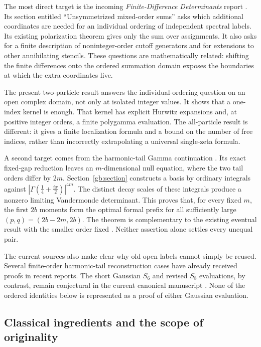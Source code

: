 \documentclass[11pt,a4paper]{article}
\numberwithin{equation}{section}
\theoremstyle{definition}
\theoremstyle{remark}
\begin{document}
The most direct target is the incoming \emph{Finite-Difference
Determinants} report \cite{repo:finite}. Its section entitled
``Unsymmetrized mixed-order sums'' asks which additional coordinates are
needed for an individual ordering of independent spectral labels.
Its existing polarization theorem gives only the sum over assignments.
It also asks for a finite description of noninteger-order cutoff
generators and for extensions to other annihilating stencils. These
questions are mathematically related: shifting the finite differences
onto the ordered summation domain exposes the boundaries at which
the extra coordinates live.

The present two-particle result answers the individual-ordering question
on an open complex domain, not only at isolated integer values.
It shows that a one-index kernel is enough. That kernel has explicit
Hurwitz expansions and, at positive integer orders, a finite polygamma
evaluation. The all-particle result is different: it gives a finite
localization formula and a bound on the number of free indices, rather
than incorrectly extrapolating a universal single-zeta formula.

A second target comes from the harmonic-tail Gamma continuation
\cite{repo-gamma}. Its exact fixed-gap reduction leaves an
$m$-dimensional null equation, where the two tail orders differ by
$2m$. Section~\ref{gb:section} constructs a basis by ordinary integrals
against $|\Gamma(\tfrac14+\tfrac{ix}{2})|^{4m}$. The distinct
decay scales of these integrals produce a nonzero limiting Vandermonde
determinant. This proves that, for every fixed $m$, the first $2b$
moments form the optimal formal prefix for all sufficiently large
$(p,q)=(2b-2m,2b)$. The theorem is complementary to the existing
eventual result with the smaller order fixed \cite{repo:quartic}. Neither assertion alone
settles every unequal pair.

The current sources also make clear why old open labels cannot simply
be reused. Several finite-order harmonic-tail reconstruction cases have
already received proofs in recent reports. The short Gaussian $S_6$
and revised $S_8$ evaluations, by contrast, remain conjectural in the
current canonical manuscript \cite{repo:ledger,repo:gaussian}. None of
the ordered identities below is represented as a proof of either
Gaussian evaluation.

\subsection{Classical ingredients and the scope of originality}
\end{document}
